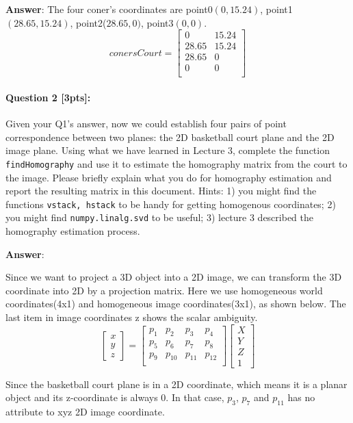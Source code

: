 \documentclass[11pt]{article}
\begin{document}
\textbf{Answer}:  The four coner's coordinates are point0$(0,15.24)$, point1$(28.65,15.24)$, point2($28.65,0)$, point3$(0,0)$. 
\[
conersCourt = 
\left[
\begin{array}{cc}
0 & 15.24 \\
28.65 & 15.24 \\
28.65 & 0 \\
0 & 0 \\
\end{array}
\right]
\]
\paragraph{Question 2 [3pts]:}
Given your Q1's answer, now we could establish four pairs of point correspondence between two planes: the 2D basketball court plane and the 2D image plane. Using what we have learned in Lecture 3, complete the function \texttt{findHomography} and use it to estimate the homography matrix from the court to the image. Please briefly explain what you do for homography estimation and report the resulting matrix in this document. Hints: 1) you might find the functions \texttt{vstack, hstack} to be handy for getting homogenous coordinates; 2) you might find \texttt{numpy.linalg.svd} to be useful; 3) lecture 3 described the homography estimation process. 

\textbf{Answer}: 

Since we want to project a 3D object into a 2D image, we can transform the 3D coordinate into 2D by a projection matrix. Here we use homogeneous world coordinates(4x1) and homogeneous image coordinates(3x1), as shown below. The last item in image coordinates z shows the scalar ambiguity.
\[
\left[
\begin{array}{c}
x \\
y \\
z
\end{array}
\right] = 
\left[
\begin{array}{cccc}
p_1 & p_2 & p_3 & p_4 \\
p_5 & p_6 & p_7 & p_8 \\
p_9 & p_{10} & p_{11} & p_{12} \\
\end{array}
\right]
\left[
\begin{array}{c}
X \\
Y \\
Z \\
1
\end{array}
\right]
\]

Since the basketball court plane is in a 2D coordinate, which means it is a planar object and its z-coordinate is always 0. In that case, $p_3$, $p_7$ and $p_11$ has no attribute to xyz 2D image coordinate.
\end{document}
